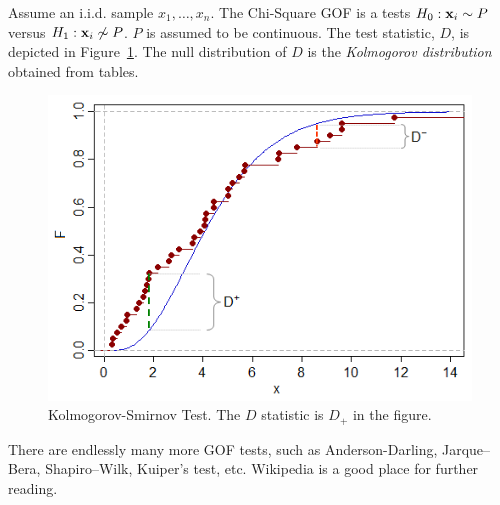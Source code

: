 \begin{definition}
Assume an i.i.d. sample $x_1,\dots,x_n$. 
The Chi-Square GOF is a tests $H_0: \mathbf{x}_i \sim P$ versus $H_1: \mathbf{x}_i \not\sim P$.
$P$ is assumed to be continuous.
The test statistic, $D$, is depicted in Figure~\ref{fig:ks_test}.
The null distribution of $D$ is the \emph{Kolmogorov distribution} obtained from tables.

\begin{figure}
\centering
\includegraphics[height=0.3\textheight]{art/Kgn0O}
\caption[Kolmogorov-Smirnov Test]{Kolmogorov-Smirnov Test. The $D$ statistic is $D_+$ in the figure.}
\label{fig:ks_test}
\end{figure}

\end{definition} 






\begin{extra}
There are endlessly many more GOF tests, such as Anderson-Darling, Jarque–Bera, Shapiro–Wilk, Kuiper's test, etc.
Wikipedia is a good place for further reading.
\end{extra}
